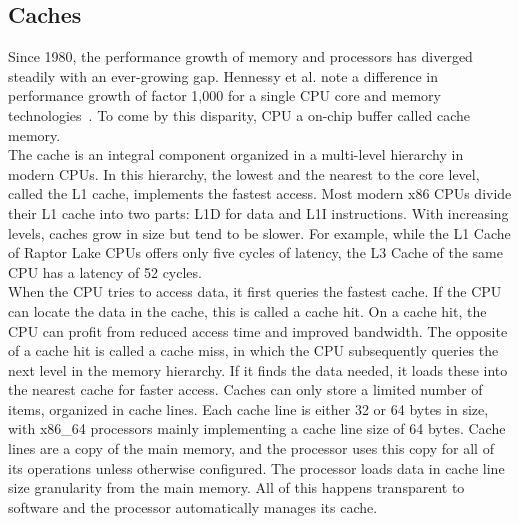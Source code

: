 \subsection{Caches}
\label{sec:state:technical:caches}
Since 1980, the performance growth of memory and processors has diverged
steadily with an ever-growing gap. Hennessy et al. note a difference in
performance growth of factor 1,000 for a single CPU core and memory
technologies~\cite{hennessy2011computer}. To come by this disparity, CPU a
on-chip buffer called cache memory.\\


The cache is an integral component organized in a multi-level hierarchy in
modern CPUs. In this hierarchy, the lowest and the nearest to the core level,
called the L1 cache, implements the fastest access. Most modern x86 CPUs divide
their L1 cache into two parts: L1D for data and L1I instructions. With
increasing levels, caches grow in size but tend to be slower. For example, while
the L1 Cache of Raptor Lake CPUs offers only five cycles of latency, the L3 Cache of
the same CPU has a latency of 52 cycles.\\

When the CPU tries to access data, it first queries the fastest cache. If the
CPU can locate the data in the cache, this is called a cache hit. On a cache
hit, the CPU can profit from reduced access time and improved bandwidth. The
opposite of a cache hit is called a cache miss, in which the CPU subsequently
queries the next level in the memory hierarchy. If it finds the data needed, it
loads these into the nearest cache for faster access. Caches can only store a
limited number of items, organized in cache lines. Each cache line is either 32
or 64 bytes in size, with x86\_64 processors mainly implementing a cache line
size of 64 bytes. Cache lines are a copy of the main memory, and the processor
uses this copy for all of its operations unless otherwise configured. The
processor loads data in cache line size granularity from the main memory. All of
this happens transparent to software and the processor automatically manages its
cache. \\

